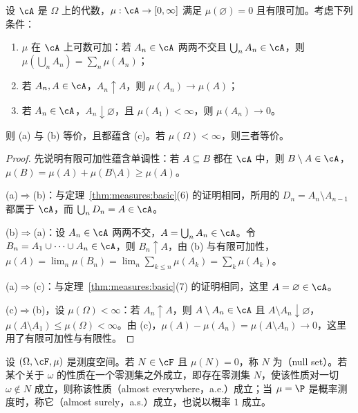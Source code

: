 \begin{proposition}[可数可加性与连续性]\label{prop:measures:additivity-continuity}
设 $\cA$ 是 $\Omega$ 上的代数，$\mu:\cA\to[0,\infty]$ 满足 $\mu(\varnothing)=0$ 且有限可加。考虑下列条件：
\begin{enumerate}
\item[(a)] $\mu$ 在 $\cA$ 上可数可加：若 $A_n\in\cA$ 两两不交且 $\bigcup_nA_n\in\cA$，则 $\mu(\bigcup_nA_n)=\sum_n\mu(A_n)$；
\item[(b)] 若 $A_n,A\in\cA$，$A_n\uparrow A$，则 $\mu(A_n)\to\mu(A)$；
\item[(c)] 若 $A_n\in\cA$，$A_n\downarrow\varnothing$，且 $\mu(A_1)<\infty$，则 $\mu(A_n)\to0$。
\end{enumerate}
则 (a) 与 (b) 等价，且都蕴含 (c)。若 $\mu(\Omega)<\infty$，则三者等价。
\end{proposition}
\begin{proof}
先说明有限可加性蕴含单调性：若 $A\subseteq B$ 都在 $\cA$ 中，则 $B\setminus A\in\cA$，$\mu(B)=\mu(A)+\mu(B\setminus A)\geqslant\mu(A)$。

(a)$\Rightarrow$(b)：与定理~\ref{thm:measures:basic}(6) 的证明相同，所用的 $D_n=A_n\setminus A_{n-1}$ 都属于 $\cA$，而 $\bigcup_nD_n=A\in\cA$。

(b)$\Rightarrow$(a)：设 $A_n\in\cA$ 两两不交，$A=\bigcup_nA_n\in\cA$。令 $B_n=A_1\cup\cdots\cup A_n\in\cA$，则 $B_n\uparrow A$，由 (b) 与有限可加性，$\mu(A)=\lim_n\mu(B_n)=\lim_n\sum_{k\leqslant n}\mu(A_k)=\sum_k\mu(A_k)$。

(a)$\Rightarrow$(c)：与定理~\ref{thm:measures:basic}(7) 的证明相同，这里 $A=\varnothing\in\cA$。

(c)$\Rightarrow$(b)，设 $\mu(\Omega)<\infty$：若 $A_n\uparrow A$，则 $A\setminus A_n\in\cA$ 且 $A\setminus A_n\downarrow\varnothing$，$\mu(A\setminus A_1)\leqslant\mu(\Omega)<\infty$。由 (c)，$\mu(A)-\mu(A_n)=\mu(A\setminus A_n)\to0$，这里用了有限可加性与有限性。
\end{proof}

\begin{definition}[零测集与几乎处处]\label{def:measures:null}
设 $(\Omega,\cF,\mu)$ 是测度空间。若 $N\in\cF$ 且 $\mu(N)=0$，称 $N$ 为（null set）。若某个关于 $\omega$ 的性质在一个零测集之外成立，即存在零测集 $N$，使该性质对一切 $\omega\notin N$ 成立，则称该性质（almost everywhere，a.e.）成立；当 $\mu=\P$ 是概率测度时，称它（almost surely，a.s.）成立，也说以概率 $1$ 成立。
\end{definition}

